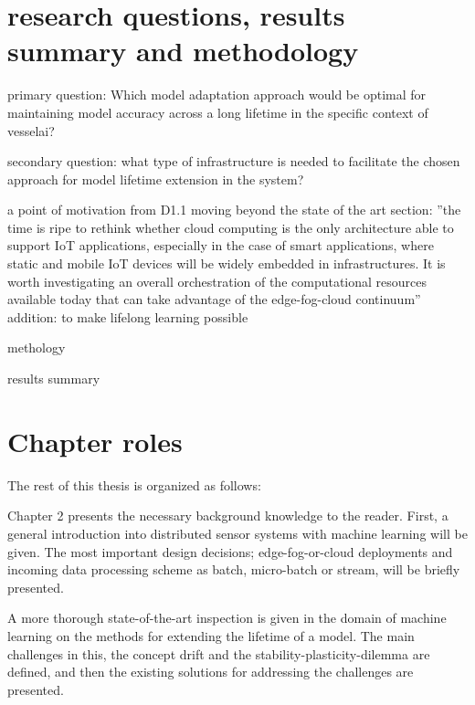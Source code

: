 

\section{research questions, results summary and methodology}

primary question: Which model adaptation approach would be optimal for maintaining model accuracy across a long lifetime in the specific context of vesselai?

secondary question: what type of infrastructure is needed to facilitate the chosen approach for model lifetime extension in the system?


a point of motivation from D1.1 moving beyond the state of the art section: ''the time is ripe  to  rethink  whether  cloud  computing  is  the  only  architecture  able  to  support  IoT  applications, especially  in  the  case  of  smart applications,  where  static  and  mobile  IoT  devices  will  be  widely embedded  in  infrastructures.  It  is  worth  investigating  an  overall  orchestration  of  the  computational resources  available  today  that  can  take  advantage  of  the  edge-fog-cloud  continuum'' addition: to make lifelong learning possible

methology



results summary

\section{Chapter roles}


The rest of this thesis is organized as follows:

Chapter 2 presents the necessary background knowledge to the reader. First, a general introduction into distributed sensor systems with machine learning will be given. The most important design decisions; edge-fog-or-cloud deployments and incoming data processing scheme as batch, micro-batch or stream, will be briefly presented.

A more thorough state-of-the-art inspection is given in the domain of machine learning on the methods for extending the lifetime of a model. The main challenges in this, the concept drift and the stability-plasticity-dilemma are defined, and then the existing solutions for addressing the challenges are presented.

